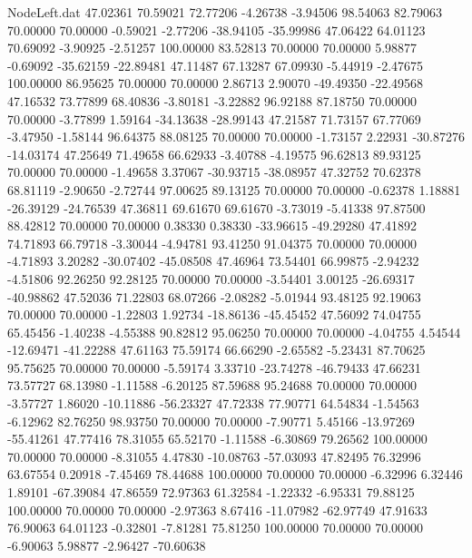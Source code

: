 \begin{filecontents}{NodeLeft.dat}
  47.02361   70.59021   72.77206    -4.26738   -3.94506   98.54063   82.79063   70.00000   70.00000   -0.59021   -2.77206  -38.94105  -35.99986
  47.06422   64.01123   70.69092    -3.90925   -2.51257  100.00000   83.52813   70.00000   70.00000    5.98877   -0.69092  -35.62159  -22.89481
  47.11487   67.13287   67.09930    -5.44919   -2.47675  100.00000   86.95625   70.00000   70.00000    2.86713    2.90070  -49.49350  -22.49568
  47.16532   73.77899   68.40836    -3.80181   -3.22882   96.92188   87.18750   70.00000   70.00000   -3.77899    1.59164  -34.13638  -28.99143
  47.21587   71.73157   67.77069    -3.47950   -1.58144   96.64375   88.08125   70.00000   70.00000   -1.73157    2.22931  -30.87276  -14.03174
  47.25649   71.49658   66.62933    -3.40788   -4.19575   96.62813   89.93125   70.00000   70.00000   -1.49658    3.37067  -30.93715  -38.08957
  47.32752   70.62378   68.81119    -2.90650   -2.72744   97.00625   89.13125   70.00000   70.00000   -0.62378    1.18881  -26.39129  -24.76539
  47.36811   69.61670   69.61670    -3.73019   -5.41338   97.87500   88.42812   70.00000   70.00000    0.38330    0.38330  -33.96615  -49.29280
  47.41892   74.71893   66.79718    -3.30044   -4.94781   93.41250   91.04375   70.00000   70.00000   -4.71893    3.20282  -30.07402  -45.08508
  47.46964   73.54401   66.99875    -2.94232   -4.51806   92.26250   92.28125   70.00000   70.00000   -3.54401    3.00125  -26.69317  -40.98862
  47.52036   71.22803   68.07266    -2.08282   -5.01944   93.48125   92.19063   70.00000   70.00000   -1.22803    1.92734  -18.86136  -45.45452
  47.56092   74.04755   65.45456    -1.40238   -4.55388   90.82812   95.06250   70.00000   70.00000   -4.04755    4.54544  -12.69471  -41.22288
  47.61163   75.59174   66.66290    -2.65582   -5.23431   87.70625   95.75625   70.00000   70.00000   -5.59174    3.33710  -23.74278  -46.79433
  47.66231   73.57727   68.13980    -1.11588   -6.20125   87.59688   95.24688   70.00000   70.00000   -3.57727    1.86020  -10.11886  -56.23327
  47.72338   77.90771   64.54834    -1.54563   -6.12962   82.76250   98.93750   70.00000   70.00000   -7.90771    5.45166  -13.97269  -55.41261
  47.77416   78.31055   65.52170    -1.11588   -6.30869   79.26562  100.00000   70.00000   70.00000   -8.31055    4.47830  -10.08763  -57.03093
  47.82495   76.32996   63.67554     0.20918   -7.45469   78.44688  100.00000   70.00000   70.00000   -6.32996    6.32446    1.89101  -67.39084
  47.86559   72.97363   61.32584    -1.22332   -6.95331   79.88125  100.00000   70.00000   70.00000   -2.97363    8.67416  -11.07982  -62.97749
  47.91633   76.90063   64.01123    -0.32801   -7.81281   75.81250  100.00000   70.00000   70.00000   -6.90063    5.98877   -2.96427  -70.60638

\end{filecontents}

